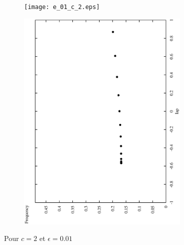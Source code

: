 \documentclass[12pt,a4paper,onecolumn]{article}
\begin{document}
\begin{figure}[htb]
	\centering
	\begin{subfigure}[b]{\textwidth}
		\texttt{[image: e\_01\_c\_2.eps]}
	\end{subfigure}
%
	\begin{subfigure}[b]{\textwidth}
		\includegraphics[angle = 270, width = 0.9\textwidth]{freq_c_2.eps}
	\end{subfigure}
	\caption{Pour $c = 2$ et $\epsilon = 0.01$}
\end{figure}
\end{document}
